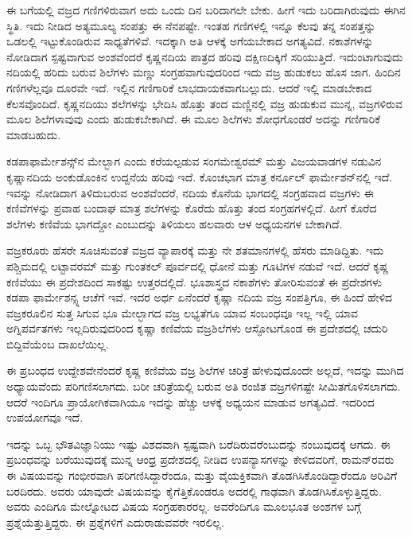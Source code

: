 ಈ ಬಗೆಯಲ್ಲಿ ವಜ್ರದ ಗಣಿಗಳಿರುವಾಗ ಅದು ಒಂದು ದಿನ ಬರಿದಾಗಲೇ ಬೇಕು. ಹೀಗೆ ಇದು ಬರಿದಾಗಿರುವುದು ಈಗಿನ ಸ್ಥಿತಿ. ಇದು ನೀಡಿದ ಅತ್ಯಮೂಲ್ಯ ಸಂಪತ್ತು ಈ ನೆನಪಷ್ಟೇ. ಇಂತಹ ಗಣಿಗಳಲ್ಲಿ ಇನ್ನೂ ಕೆಲವು ತನ್ನ ಸಂಪತ್ತನ್ನು ಒಡಲಲ್ಲಿ ಇಟ್ಟುಕೊಂಡಿರುವ ಸಾಧ್ಯತೆಗಳಿವೆ. ಇದಕ್ಕಾಗಿ ಅತಿ ಆಳಕ್ಕೆ ಅಗೆಯಬೇಕಾದ ಅಗತ್ಯವಿದೆ. ನಕಾಶೆಗಳನ್ನು ನೋಡಿದಾಗ ಸ್ಪಷ್ಟವಾಗುವ ಅಂಶವೆಂದರೆ ಕೃಷ್ಣನದಿಯ ಪಾತ್ರದ ಹರಿವು ದಕ್ಷಿಣದಿಕ್ಕಿಗೆ ಸರಿಯುತ್ತಿದೆ. ಇದುಂಟಾಗುವುದು ನದಿಯಲ್ಲಿ ಹರಿದು ಬರುವ ಶಿಲೆಗಳು ಮಣ್ಣು ಸಂಗ್ರಹವಾಗುವುದರಿಂದ ಇದು ವಜ್ರ ಹುಡುಕಲು ಹೊಸ ಜಾಗ. ಹಿಂದಿನ ಗಣಿಗಳೆಲ್ಲವೂ ದೂರವೇ ಇದೆ. ಇಲ್ಲಿನ ಗಣಿಗಾರಿಕೆ ಲಾಭದಾಯಕವಾಗಬಲ್ಲುದು. ಆದರೆ ಇಲ್ಲಿ ಮಾಡಬೇಕಾದ ಕೆಲಸವೊಂದಿದೆ. ಕೃಷ್ಣನದಿಯು ಶಲೆಗಳನ್ನು ಭೇದಿಸಿ ಹೊತ್ತು ತಂದ ಮಣ್ಣಿನಲ್ಲಿ ವಜ್ರ ಹುಡುಕುವ ಮುನ್ನ, ವಜ್ರಗಳಿರುವ ಮೂಲ ಶಿಲೆಗಳಾವುವು ಎಂದು ಹುಡುಕಬೇಕಾಗಿದೆ. ಈ ಮೂಲ ಶಿಲೆಗಳು ಶೋಧಗೊಂಡರೆ ಅದನ್ನು ಗಣಿಗಾರಿಕೆ ಮಾಡಬಹುದು. 

ಕಡಪಾಫಾರ್ಮೇಶನ್ಸ್‌ನ ಮೇಲ್ಭಾಗ ಎಂದು ಕರೆಯಲ್ಪಡುವ ಸಂಗಮೇಶ್ವರಮ್ ಮತ್ತು ವಿಜಯವಾಡಗಳ ನಡುವಿನ ಕೃಷ್ಣಾನದಿಯ ಅಂಕುಡೊಂಕಿನ ಉದ್ದನೆಯ ಹರಿವು ಇದೆ. ಕೊಂಚಭಾಗ ಮಾತ್ರ ಕರ್ನೂಲ್ ಫಾರ್ಮೇಶನ್‌ನಲ್ಲಿ ಇದೆ. ಇವನ್ನು ನೋಡಿದಾಗ ತಿಳಿದುಬರುವ ಅಂಶವೆಂದರೆ, ನದಿಯ ಕೊನೆಯ ಭಾಗದಲ್ಲಿ ಸಂಗ್ರಹವಾದ ವಜ್ರಗಳು ಈ ಕಣಿವೆಗಳನ್ನು ಪ್ರವಾಹ ಬಂದಾಘ ಮಾತ್ರ ಶಲೆಗಳನ್ನು ಕೊರೆದು ಹೊತ್ತು ತಂದ ಸಂಗ್ರಹಗಳಲ್ಲಿದೆ. ಹೀಗೆ ಕೊರೆದ ಶಲೆಗಳು ಕಣಿವೆಯ ಭಾಗದ್ದೋ ಎಂಬುದನ್ನು ತಿಳಿಯಲು ಹಲವಾರು ಆಳ ಅಧ್ಯಯನಗಳ ಬೇಕಾಗಿದೆ.

ವಜ್ರಕರೂರು ಹೆಸರೇ ಸೂಚಿಸುವಂತೆ ವಜ್ರದ ವ್ಯಾಪಾರಕ್ಕೆ  ಮತ್ತು  ನೇ ಶತಮಾನಗಳಲ್ಲಿ ಹೆಸರು ಮಾಡಿದ್ದಿತು. ಇದು ಪಶ್ಚಿಮದಲ್ಲಿ ಲಟ್ಟಾವರಮ್ ಮತ್ತು ಗುಂತಕಲ್ ಪೂರ್ವದಲ್ಲಿ ಧೋನೆ ಮತ್ತು ಗೂಟಿಗಳ ನಡುವೆ ಇದೆ. ಆದರೆ ಕೃಷ್ಣ ಕಣಿವೆಯು ಈ ಪ್ರದೇಶದಿಂದ ಸಾಕಷ್ಟು ಉತ್ತರದಲ್ಲಿದೆ. ಭೂಶಾಸ್ತ್ರದ ನಕಾಶೆಗಳು ತೋರಿಸುವಂತೆ ಈ ಪ್ರದೇಶಗಳು ಕಡಪಾ ಫಾರ್ಮೇಶನ್ಸ್ನ ಆಚೆಗೆ ಇವೆ. ಇದರ ಅರ್ಥ ಏನೆಂದರೆ ಕೃಷ್ಣಾ ನದಿಯ ವಜ್ರ ಸಂಪತ್ತಿಗೂ, ಈ ಹಿಂದೆ ಹೇಳಿದ ವಜ್ರಕರೂಲಿನ ಸುತ್ತ ಸಿಗುವ ಭೂ ಮೇಲ್ಭಾಗದ ವಜ್ರ ಲಭ್ಯತೆಗೂ ಯಾವ ಸಂಬಂಧವೂ ಇಲ್ಲ ಇಲ್ಲಿ ಯಾವ ಅಗ್ನಿಪರ್ವತಗಳು ಇಲ್ಲದಿರುವುದರಿಂದ ಕೃಷ್ಣಾ ಕಣಿವೆಯ ವಜ್ರಶಿಲೆಗಳು ಆಸ್ಫೋಟಗೊಂಡ ಈ ಪ್ರದೇಶದಲ್ಲಿ ಚದುರಿ ಬಿದ್ದಿವೆಯೆಂಬ ದಾಖಲೆಯಿಲ್ಲ.

ಈ ಪ್ರಬಂಧದ ಉದ್ದೇಶವೇನೆಂದರೆ ಕೃಷ್ಣ ಕಣಿವೆಯ ವಜ್ರ ಶಿಲೆಗಳ ಚರಿತ್ರೆ ಹೇಳುವುದೊಂದೇ ಅಲ್ಲದೆ, ಇದನ್ನು ಮುಗಿದ ಅಧ್ಯಾಯವೆಂದು ಪರಿಗಣಿಸಲಾಗದು. ಬರೀ ಚರಿತ್ರೆಯಲ್ಲಿ ಬರುವ ಅತಿ ರಂಜಿತ ವಜ್ರಗಳಿಗಷ್ಟೇ ಸೀಮಿತಗೊಳಿಸಲಾಗದು. ಆದರೆ ಇಂದಿಗೂ ಪ್ರಾಯೋಗಿಕವಾಗಿಯೂ ಇದನ್ನು ಹೆಚ್ಚು ಆಳಕ್ಕೆ ಅಧ್ಯಯನ ಮಾಡುವ ಅಗತ್ಯವಿದೆ. ಇದರಿಂದ ಉಪಯೋಗವೂ ಇದೆ.

ಇದನ್ನು ಒಬ್ಬ ಭೌತವಿಜ್ಞಾನಿಯು ಇಷ್ಟು ವಿಶದವಾಗಿ ಸ್ಪಷ್ಟವಾಗಿ ಬರೆದಿರುವರೆಂಬುದನ್ನು ನಂಬುವುದಕ್ಕೆ ಆಗದು. ಈ ಪ್ರಬಂಧವನ್ನು ಬರೆಯುವುದಕ್ಕೆ ಮುನ್ನ ಆಂಧ್ರ ಪ್ರದೇಶದಲ್ಲಿ ನೀಡಿದ ಉಪನ್ಯಾಸಗಳನ್ನು ಕೇಳಿದವರಿಗೆ, ರಾಮನ್‌ರವರು ಈ ವಿಷಯವನ್ನು ಗಂಭೀರವಾಗಿ ಪರಿಗಣಿಸಿದ್ದಾರೆಂದೂ, ಮತ್ತು ವೈಯಕ್ತಿಕವಾಗಿ ತೊಡಗಿಸಿಕೊಂಡಿದ್ದಾರೆಂದೂ ಅರಿವಿಗೆ ಬರದಿರದು. ಅವರು ಯಾವುದೇ ವಿಷಯವನ್ನು ಕೈಗೆತ್ತಿಕೊಂಡರೂ ಅದರಲ್ಲಿ ಗಾಢವಾಗಿ ತೊಡಗಿಸಿಕೊಳ್ಳುತ್ತಿದ್ದರು. ಅವರು ಎಂದಿಗೂ ಮೇಲ್ನೋಟದ ವಿಷಯ ಸಂಗ್ರಹಕಾರರಲ್ಲ. ಅವರೆಂದಿಗೂ ಮೂಲಭೂತ ಅಂಶಗಳ ಬಗ್ಗೆ ಪ್ರಶ್ನೆಯೆತ್ತುತ್ತಿದ್ದರು. ಈ ಪ್ರಶ್ನೆಗಳಿಗೆ ಎದುರಾಡುವವರೇ ಇರಲಿಲ್ಲ.

